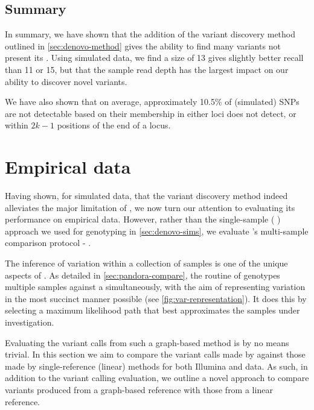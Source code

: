 \subsection{Summary}

In summary, we have shown that the addition of the \denovo{} variant discovery method outlined in \autoref{sec:denovo-method} gives \pandora{} the ability to find many variants not present its \panrg{}. Using simulated data, we find a \kmer{} size of 13 gives slightly better recall than 11 or 15, but that the sample read depth has the largest impact on our ability to discover novel variants.

We have also shown that on average, approximately 10.5\% of (simulated) SNPs are not detectable based on their membership in either loci \pandora{} does not detect, or within $2k-1$ positions of the end of a locus.

\section{Empirical data}
\label{sec:denovo-empirical}

Having shown, for simulated data, that the \denovo{} variant discovery method indeed alleviates the major limitation of \pandora{}, we now turn our attention to evaluating its performance on empirical data. However, rather than the single-sample (\pandora{} ) approach we used for genotyping in \autoref{sec:denovo-sims}, we evaluate \pandora{}'s multi-sample comparison protocol - \compare{}.

The inference of variation within a collection of samples is one of the unique aspects of \pandora{}. As detailed in \autoref{sec:pandora-compare}, the  routine of \pandora{} genotypes multiple samples against a \panrg{} simultaneously, with the aim of representing variation in the most succinct manner possible (see \autoref{fig:var-representation}). It does this by selecting a maximum likelihood path that best approximates the samples under investigation.

Evaluating the variant calls from such a graph-based method is by no means trivial. In this section we aim to compare the variant calls made by \pandora{} against those made by single-reference (linear) methods for both Illumina and \ont{} data. As such, in addition to the variant calling evaluation, we outline a novel approach to compare variants produced from a graph-based reference with those from a linear reference.

